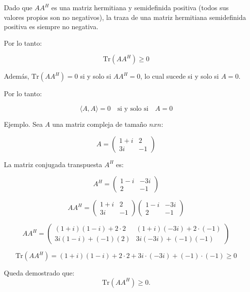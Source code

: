 \documentclass{article}
\begin{document}
Dado que \(A A^H\) es una matriz hermitiana y semidefinida positiva (todos sus valores propios son no negativos), la traza de una matriz hermitiana semidefinida positiva es siempre no negativa.

Por lo tanto:

\[
\text{Tr}(A A^H) \geq 0
\]

Además, \(\text{Tr}(A A^H) = 0\) si y solo si \(A A^H = 0\), lo cual sucede si y solo si \(A = 0\).

Por lo tanto:

\[
\langle A, A \rangle = 0 \quad \text{si y solo si} \quad A = 0
\]

Ejemplo. Sea \( A \) una matriz compleja de tamaño \( nxn \):

\[
A = \begin{pmatrix}
1 + i & 2 \\
3i & -1
\end{pmatrix}
\]

La matriz conjugada transpuesta \( A^H \) es:

\[
A^H = \begin{pmatrix}
1 - i & -3i \\
2 & -1
\end{pmatrix}
\]

\[
A A^H = \begin{pmatrix}
1 + i & 2 \\
3i & -1
\end{pmatrix}
\begin{pmatrix}
1 - i & -3i \\
2 & -1
\end{pmatrix}
\]

\[
A A^H = \begin{pmatrix}
(1+i)(1-i) + 2 \cdot 2 & (1+i)(-3i) + 2 \cdot (-1) \\
3i(1-i) + (-1)(2) & 3i(-3i) + (-1)(-1)
\end{pmatrix}
\]

\[
\text{Tr}(A A^H) = (1+i)(1-i) + 2 \cdot 2 + 3i \cdot (-3i) + (-1) \cdot (-1) \geq 0
\]


Queda demostrado que: \[\text{Tr}(A A^H) \geq 0.\]
\end{document}
